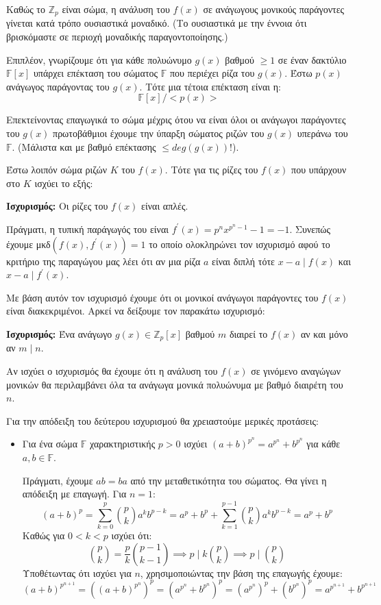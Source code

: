 \documentclass[oneside,a4paper]{article}
\newcommand{\Z}{\mathbb{Z}}
\begin{document}
\begin{enumerate}
			Καθώς το $\Z_p$ είναι σώμα, η ανάλυση του $f(x)$ σε ανάγωγους μονικούς παράγοντες γίνεται κατά τρόπο ουσιαστικά μοναδικό. (Το ουσιαστικά με την έννοια ότι βρισκόμαστε σε περιοχή μοναδικής παραγοντοποίησης.) 
			
			Επιπλέον, γνωρίζουμε ότι για κάθε πολυώνυμο $g(x)$ βαθμού $\geq 1$ σε έναν δακτύλιο $\mathbb{F} [x]$ υπάρχει επέκταση του σώματος $\mathbb{F}$ που περιέχει ρίζα του $g(x)$. Έστω $p(x)$ ανάγωγος παράγοντας του $g(x)$. Τότε μια τέτοια επέκταση είναι η:
			$$\mathbb{F}[x]  / <p(x)>$$
			
			Επεκτείνοντας επαγωγικά το σώμα μέχρις ότου να είναι όλοι οι ανάγωγοι παράγοντες του $g(x)$ πρωτοβάθμιοι έχουμε την ύπαρξη σώματος ριζών του $g(x)$ υπεράνω του $\mathbb{F}$. (Μάλιστα και με βαθμό επέκτασης $\leq deg\left( g(x) \right) !$).
			
			Έστω λοιπόν σώμα ριζών $K$ του $f(x)$. Τότε για τις ρίζες του $f(x)$ που υπάρχουν στο $K$ ισχύει το εξής:
			$ $\newline

			\textbf{Ισχυρισμός:} Οι ρίζες του $f(x)$ είναι απλές.

			Πράγματι, η τυπική παράγωγός του είναι $f^{\prime} (x) = p^n x^{p^n - 1} - 1 = -1$. Συνεπώς έχουμε μκδ$(f(x),f^{\prime} (x) ) = 1$ το οποίο ολοκληρώνει τον ισχυρισμό αφού το κριτήριο της παραγώγου μας λέει ότι αν μια ρίζα $a$ είναι διπλή τότε $x-a \mid f(x)$ και $x-a \mid f^{\prime} (x)$.

			Με βάση αυτόν τον ισχυρισμό έχουμε ότι οι μονικοί ανάγωγοι παράγοντες του $f(x)$ είναι διακεκριμένοι. Αρκεί να δείξουμε τον παρακάτω ισχυρισμό:

			\textbf{Ισχυρισμός:} Ένα ανάγωγο $g(x) \in \Z_p [x]$ βαθμού $m$ διαιρεί το $f(x)$ αν και μόνο αν $m \mid n$.

			Αν ισχύει ο ισχυρισμός θα έχουμε ότι η ανάλυση του $f(x)$ σε γινόμενο αναγώγων μονικών θα περιλαμβάνει όλα τα ανάγωγα μονικά πολυώνυμα με βαθμό διαιρέτη του $n$.

			Για την απόδειξη του δεύτερου ισχυρισμού θα χρειαστούμε μερικές προτάσεις:

			\begin{itemize}
				\item Για ένα σώμα $\mathbb{F}$ χαρακτηριστικής $p>0$ ισχύει $(a+b)^{p^n} = a^{p^n} + b^{p^n}$ για κάθε $a,b \in \mathbb{F}$.

					Πράγματι, έχουμε $ab=ba$ από την μεταθετικότητα του σώματος. Θα γίνει η απόδειξη με επαγωγή. Για $n=1$:
					$$(a+b)^p = \sum\limits_{k=0}^p \binom{p}{k} a^k b^{p-k} = a^p + b^p + \sum\limits_{k=1}^{p-1} \binom{p}{k} a^k b^{p-k}= a^p + b^p$$
					Καθώς για $0< k < p$ ισχύει ότι:
					$$\binom{p}{k} = \frac{p}{k} \binom{p-1}{k-1} \implies p \mid k \binom{p}{k} \implies p \mid \binom{p}{k}$$
					Υποθέτωντας ότι ισχύει για $n$, χρησιμοποιώντας την βάση της επαγωγής έχουμε:
					$$\left(a+b\right)^{p^{n+1}} = \left( \left( a+b \right)^{p^n}  \right)^p = \left( a^{p^n} + b^{p^n} \right)^p = \left( a^{p^n} \right)^p + \left( b^{p^n} \right)^p = a^{p^{n+1}} + b^{p^{n+1}}    $$
					$ $\newline


\end{itemize}
\end{enumerate}
\end{document}
